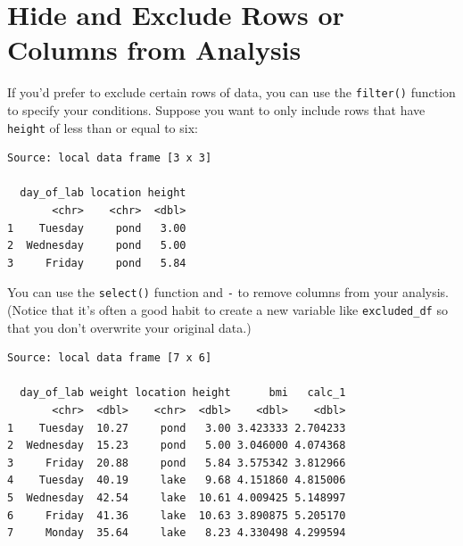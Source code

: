 \documentclass[twoside, 12pt]{article}
\newenvironment{Shaded}{\begin{snugshade}}{\end{snugshade}}
\newcommand{\KeywordTok}[1]{\textcolor[rgb]{0.13,0.29,0.53}{\textbf{{#1}}}}
\newcommand{\DecValTok}[1]{\textcolor[rgb]{0.00,0.00,0.81}{{#1}}}
\newcommand{\StringTok}[1]{\textcolor[rgb]{0.31,0.60,0.02}{{#1}}}
\newcommand{\NormalTok}[1]{{#1}}
\newcommand{\nonumsection}[1]{
  \addtocontents{toc}{\protect\setcounter{tocdepth}{-1}}
  \section{#1}
  \addtocontents{toc}{\protect\setcounter{tocdepth}{1}}
}
\begin{document}
\nonumsection{Hide and Exclude Rows or Columns from Analysis}

If you'd prefer to exclude certain rows of data, you can use the
\texttt{filter()} function to specify your conditions. Suppose you want
to only include rows that have \texttt{height} of less than or equal to
six:

\begin{Shaded}
\end{Shaded}

\begin{Verbatim}[frame=single]
Source: local data frame [3 x 3]

  day_of_lab location height
       <chr>    <chr>  <dbl>
1    Tuesday     pond   3.00
2  Wednesday     pond   5.00
3     Friday     pond   5.84
\end{Verbatim}

You can use the \texttt{select()} function and \texttt{-} to remove
columns from your analysis. (Notice that it's often a good habit to
create a new variable like \texttt{excluded\_df} so that you don't
overwrite your original data.)

\begin{Shaded}
\end{Shaded}

\begin{Verbatim}[frame=single]
Source: local data frame [7 x 6]

  day_of_lab weight location height      bmi   calc_1
       <chr>  <dbl>    <chr>  <dbl>    <dbl>    <dbl>
1    Tuesday  10.27     pond   3.00 3.423333 2.704233
2  Wednesday  15.23     pond   5.00 3.046000 4.074368
3     Friday  20.88     pond   5.84 3.575342 3.812966
4    Tuesday  40.19     lake   9.68 4.151860 4.815006
5  Wednesday  42.54     lake  10.61 4.009425 5.148997
6     Friday  41.36     lake  10.63 3.890875 5.205170
7     Monday  35.64     lake   8.23 4.330498 4.299594
\end{Verbatim}
\end{document}
